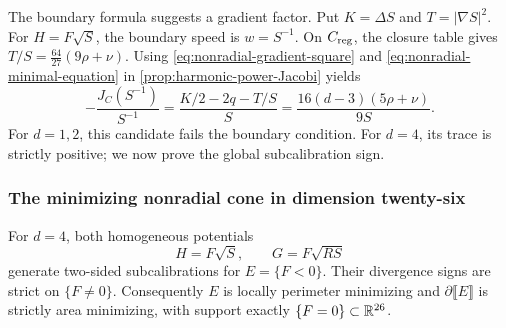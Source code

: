 The boundary formula suggests a gradient factor.
Put \(K=\Delta S\) and \(T=|\nabla S|^2\). For \(H=F\sqrt S\),
the boundary speed is \(w=S^{-1}\).
On \(C_{\mathrm{reg}}\), the closure table gives
\(T/S=\frac{64}{27}(9\rho+\nu)\). Using
\eqref{eq:nonradial-gradient-square} and
\eqref{eq:nonradial-minimal-equation} in
\cref{prop:harmonic-power-Jacobi} yields
\begin{equation}\label{eq:nonradial-Jacobi-trace}
 -\frac{J_C(S^{-1})}{S^{-1}}
 =\frac{K/2-2q-T/S}{S}
 =\frac{16(d-3)(5\rho+\nu)}{9S}.
\end{equation}
For \(d=1,2\), this candidate fails the boundary condition. For \(d=4\),
its trace is strictly positive; we now prove the global subcalibration sign.

\subsubsection{The minimizing nonradial cone in dimension twenty-six}
\label{sec:nonradial-certificate}

\begin{theorem}\label{thm:nonradial-minimizing}
For \(d=4\), both homogeneous potentials
\[
 H=F\sqrt S,\qquad G=F\sqrt{RS}
\]
generate two-sided subcalibrations for \(E=\{F<0\}\).
Their divergence signs are strict on \(\{F\ne0\}\).
Consequently \(E\) is locally perimeter minimizing and
\(\partial\llbracket E\rrbracket\) is strictly area minimizing,
with support exactly \(\{F=0\}\subset\mathbb R^{26}\).
\end{theorem}

